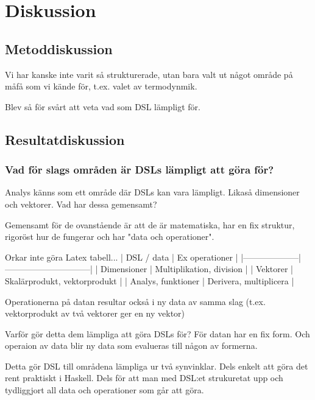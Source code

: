 
\chapter{Diskussion}

\begin{binge}
\section{Metoddiskussion}

Vi har kanske inte varit så strukturerade, utan bara valt ut något område på måfå som vi kände för, t.ex. valet av termodynmik.

Blev så för svårt att veta vad som DSL lämpligt för.

\section{Resultatdiskussion}

\subsection{Vad för slags områden är DSLs lämpligt att göra för?}

Analys känns som ett område där DSLs kan vara lämpligt. Likaså dimensioner och vektorer. Vad har dessa gemensamt?

Gemensamt för de ovanstående är att de är matematiska, har en fix struktur, rigoröst hur de fungerar och har "data och operationer".

Orkar inte göra Latex tabell...
| DSL / data         | Ex operationer               |
|--------------------|------------------------------|
| Dimensioner        | Multiplikation, division     |
| Vektorer           | Skalärprodukt, vektorprodukt |
| Analys, funktioner | Derivera, multiplicera       |

Operationerna på datan resultar också i ny data av samma slag (t.ex. vektorprodukt av två vektorer ger en ny vektor)

Varför gör detta dem lämpliga att göra DSLs för? För datan har en fix form. Och operaion av data blir ny data som evalueras till någon av formerna.

Detta gör DSL till områdena lämpliga ur två synvinklar. Dels enkelt att göra det rent praktiskt i Haskell. Dels för att man med DSL:et strukuretat upp och tydliggjort all data och operationer som går att göra.


\end{binge}
